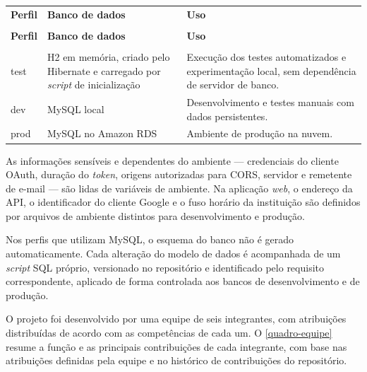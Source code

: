 {\ABNTEXfontereduzida
\renewcommand{\arraystretch}{1.25}
\begin{xltabular}{\textwidth}{|>{\raggedright\arraybackslash}p{2.5cm}|>{\raggedright\arraybackslash}p{4.9cm}|>{\raggedright\arraybackslash}X|}
 \\[0.3em]
\hline
\textbf{Perfil} & \textbf{Banco de dados} & \textbf{Uso} \\
\hline
\endfirsthead
{} \\
\hline
\textbf{Perfil} & \textbf{Banco de dados} & \textbf{Uso} \\
\hline
\endhead
{} \\
\endfoot
\endlastfoot
test & H2 em memória, criado pelo Hibernate e carregado por \textit{script} de inicialização & Execução dos testes automatizados e experimentação local, sem dependência de servidor de banco. \\
\hline
dev & MySQL local & Desenvolvimento e testes manuais com dados persistentes. \\
\hline
prod & MySQL no Amazon RDS & Ambiente de produção na nuvem. \\
\hline
\end{xltabular}
}

As informações sensíveis e dependentes do ambiente — credenciais do cliente OAuth, duração do \textit{token}, origens autorizadas para CORS, servidor e remetente de e-mail — são lidas de variáveis de ambiente. Na aplicação \textit{web}, o endereço da API, o identificador do cliente Google e o fuso horário da instituição são definidos por arquivos de ambiente distintos para desenvolvimento e produção.

Nos perfis que utilizam MySQL, o esquema do banco não é gerado automaticamente. Cada alteração do modelo de dados é acompanhada de um \textit{script} SQL próprio, versionado no repositório e identificado pelo requisito correspondente, aplicado de forma controlada aos bancos de desenvolvimento e de produção.

O projeto foi desenvolvido por uma equipe de seis integrantes, com atribuições distribuídas de acordo com as competências de cada um. O \autoref{quadro-equipe} resume a função e as principais contribuições de cada integrante, com base nas atribuições definidas pela equipe e no histórico de contribuições do repositório.

